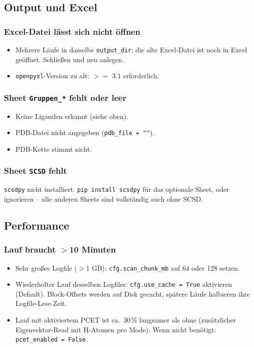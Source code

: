 \documentclass[11pt,a4paper,twoside]{article}
\theoremstyle{remark}
\begin{document}
\subsection{Output und Excel}

\subsubsection*{Excel-Datei l\"asst sich nicht \"offnen}

\begin{itemize}
  \item Mehrere L\"aufe in dasselbe \texttt{output\_dir}: die alte
        Excel-Datei ist noch in Excel ge\"offnet. Schlie\ss en und neu
        anlegen.
  \item \texttt{openpyxl}-Version zu alt: $>=$ 3.1 erforderlich.
\end{itemize}

\subsubsection*{Sheet \texttt{Gruppen\_*} fehlt oder leer}

\begin{itemize}
  \item Keine Liganden erkannt (siehe oben).
  \item PDB-Datei nicht angegeben (\texttt{pdb\_file = ""}).
  \item PDB-Kette stimmt nicht.
\end{itemize}

\subsubsection*{Sheet \texttt{SCSD} fehlt}

\texttt{scsdpy} nicht installiert. \texttt{pip install scsdpy} f\"ur
das optionale Sheet, oder ignorieren -- alle anderen Sheets sind
vollst\"andig auch ohne SCSD.

\subsection{Performance}

\subsubsection*{Lauf braucht $>$10 Minuten}

\begin{itemize}
  \item Sehr gro\ss es Logfile ($>$1 GB): \texttt{cfg.scan\_chunk\_mb}
        auf 64 oder 128 setzen.
  \item Wiederholter Lauf desselben Logfiles: \texttt{cfg.use\_cache =
        True} aktivieren (Default). Block-Offsets werden auf Disk
        gecacht, sp\"atere L\"aufe halbieren ihre Logfile-Lese-Zeit.
  \item Lauf mit aktiviertem PCET ist ca.\ 30\,\% langsamer als ohne
        (zus\"atzlicher Eigenvektor-Read mit H-Atomen pro Mode). Wenn
        nicht ben\"otigt: \texttt{pcet\_enabled = False}.
\end{itemize}
\end{document}
